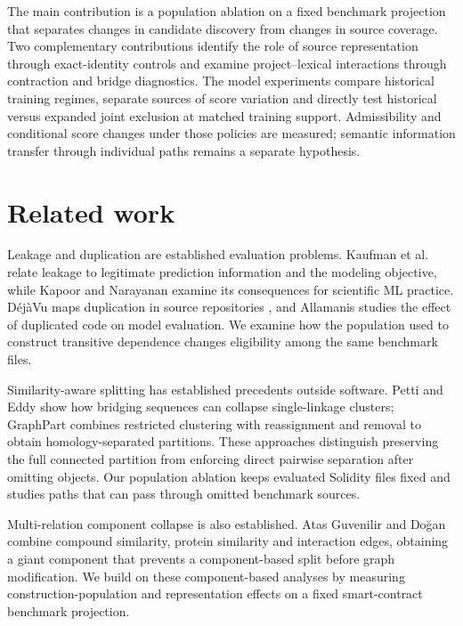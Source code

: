 \documentclass[preprint,12pt]{elsarticle}
\begin{document}
The main contribution is a population ablation on a fixed benchmark projection that separates changes in candidate discovery from changes in source coverage. Two complementary contributions identify the role of source representation through exact-identity controls and examine project--lexical interactions through contraction and bridge diagnostics. The model experiments compare historical training regimes, separate sources of score variation and directly test historical versus expanded joint exclusion at matched training support. Admissibility and conditional score changes under those policies are measured; semantic information transfer through individual paths remains a separate hypothesis.

\section{Related work}\label{related-work}

Leakage and duplication are established evaluation problems. Kaufman et al.~\cite{kaufman2012leakage} relate leakage to legitimate prediction information and the modeling objective, while Kapoor and Narayanan \cite{kapoor2023leakage} examine its consequences for scientific ML practice. DéjàVu maps duplication in source repositories \cite{lopes2017dejavu}, and Allamanis \cite{allamanis2019duplication} studies the effect of duplicated code on model evaluation. We examine how the population used to construct transitive dependence changes eligibility among the same benchmark files.

Similarity-aware splitting has established precedents outside software. Petti and Eddy \cite{petti2022independent} show how bridging sequences can collapse single-linkage clusters; GraphPart \cite{teufel2023graphpart} combines restricted clustering with reassignment and removal to obtain homology-separated partitions. These approaches distinguish preserving the full connected partition from enforcing direct pairwise separation after omitting objects. Our population ablation keeps evaluated Solidity files fixed and studies paths that can pass through omitted benchmark sources.

Multi-relation component collapse is also established. Atas Guvenilir and Doğan \cite{atasguvenilir2023dti} combine compound similarity, protein similarity and interaction edges, obtaining a giant component that prevents a component-based split before graph modification. We build on these component-based analyses by measuring construction-population and representation effects on a fixed smart-contract benchmark projection.
\end{document}
